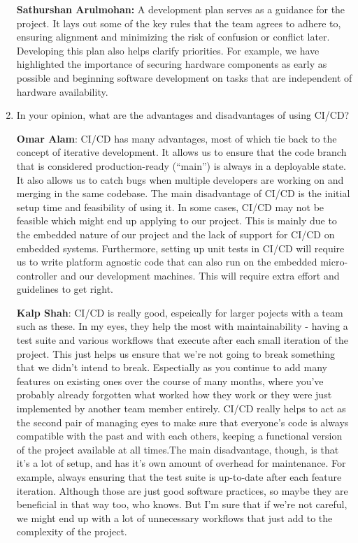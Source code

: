 \documentclass{article}
\begin{document}
\begin{enumerate}
    \textbf{Sathurshan Arulmohan:} A development plan serves as a guidance for
    the project. It lays out some of the key rules that the team agrees to
    adhere to, ensuring alignment and minimizing the risk of confusion or
    conflict later. Developing this plan also helps clarify priorities. For
    example, we have highlighted the importance of securing hardware components
    as early as possible and beginning software development on tasks that are
    independent of hardware availability.

    \item In your opinion, what are the advantages and disadvantages of using
    CI/CD?

    \textbf{Omar Alam}: CI/CD has many advantages, most of which tie back to the
    concept of iterative development. It allows us to ensure that the code
    branch that is considered production-ready (``main'') is always in a
    deployable state. It also allows us to catch bugs when multiple developers
    are working on and merging in the same codebase. The main disadvantage of
    CI/CD is the initial setup time and feasibility of using it. In some cases,
    CI/CD may not be feasible which might end up applying to our project. This
    is mainly due to the embedded nature of our project and the lack of support
    for CI/CD on embedded systems. Furthermore, setting up unit tests in CI/CD
    will require us to write platform agnostic code that can also run on the
    embedded micro-controller and our development machines. This will require
    extra effort and guidelines to get right.

    \textbf{Kalp Shah}: CI/CD is really good, espeically for larger pojects with
    a team such as these. In my eyes, they help the most with maintainability -
    having a test suite and various workflows that execute after each small
    iteration of the project. This just helps us ensure that we're not going to
    break something that we didn't intend to break. Espectially as you continue
    to add many features on existing ones over the course of many months, where
    you've probably already forgotten what worked how they work or they were
    just implemented by another team member entirely. CI/CD really helps to act
    as the second pair of managing eyes to make sure that everyone's code is
    always compatible with the past and with each others, keeping a functional
    version of the project available at all times.The main disadvantage, though,
    is that it's a lot of setup, and has it's own amount of overhead for
    maintenance. For example, always ensuring that the test suite is up-to-date
    after each feature iteration. Although those are just good software
    practices, so maybe they are beneficial in that way too, who knows. But I'm
    sure that if we're not careful, we might end up with a lot of unnecessary
    workflows that just add to the complexity of the project.
    

\end{enumerate}
\end{document}
